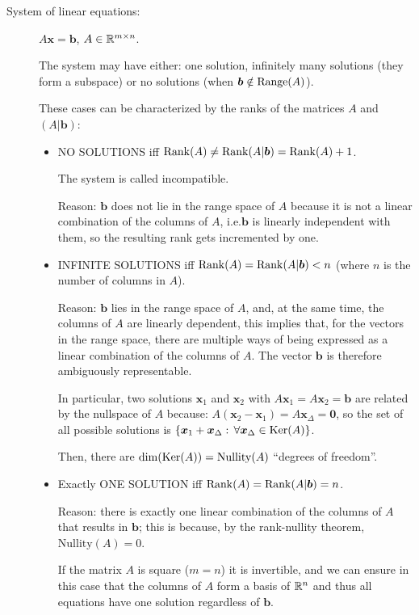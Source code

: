 \documentclass[
  12pt,
  paper=a4,
]{scrartcl} %
\begin{document}
\begin{description}
\item[System of linear equations:] $A\bm x = \bm b$, $A\in \mathbb R^{m\times n}$. 

The system may have either: one solution, infinitely many solutions (they form a subspace) or no solutions (when $\bm b \notin \operatorname{Range}(A)$).

These cases can be characterized by the ranks of the matrices $A$ and $(A|\bm b)$:
\begin{itemize}
    \item NO SOLUTIONS iff $\operatorname{Rank}(A) \neq \operatorname{Rank}(A|\bm b) = \operatorname{Rank}(A) + 1$.
    
    The system is called incompatible.
    
    Reason: $\bm b$ does not lie in the range space of $A$ because it is not a linear combination of the columns of $A$, i.e.\@ $\bm b$ is linearly independent with them, so the resulting rank gets incremented by one.
    
    \item INFINITE SOLUTIONS iff $\operatorname{Rank}(A) = \operatorname{Rank}(A|\bm b) < n$  (where $n$ is the number of columns in $A$).
    
    Reason: $\bm b$ lies in the range space of $A$, and, at the same time, the columns of $A$ are linearly dependent, this implies that, for the vectors in the range space, there are multiple ways of being expressed as a linear combination of the columns of $A$. The vector $\bm b$ is therefore ambiguously representable.
    
    In particular, two solutions $\bm x_1$ and $\bm x_2$ with $A\bm x_1=A\bm x_2=\bm b$ are related by the nullspace of $A$ because: $A(\bm x_2 -\bm x_1) = A \bm x_\Delta = \bm 0$, so the set of all possible solutions is $\{\bm x_1 +  \bm x_\Delta : \, \forall \bm x_\Delta \in \operatorname{Ker}(A) \}$. 
    
    Then, there are $\dim(\operatorname{Ker}(A))=\mathrm{Nullity}(A)$ ``degrees of freedom''.
    
    \item Exactly ONE SOLUTION iff $\operatorname{Rank}(A) = \operatorname{Rank}(A|\bm b) = 
n$.
    
    Reason: there is exactly one linear combination of the columns of $A$ that results in $\bm b$; this is because, by the rank-nullity theorem, $\mathrm{Nullity}(A)=0$.
    
    If the matrix $A$ is square ($m=n$) it is invertible, and we can ensure in this case that the columns of $A$ form a basis of $\mathbb R^n$ and thus all equations have one solution regardless of $\bm b$.


\end{itemize}
\end{description}
\end{document}
